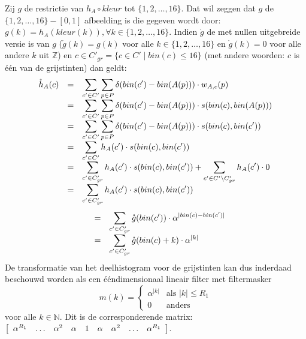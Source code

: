 Zij $g$ de restrictie van $h_A \circ kleur$ tot
$\{1,2,\ldots,16\}$. Dat wil zeggen dat $g$ de $\{1,2,\ldots,16\} - [0,1]$ afbeelding is die 
gegeven wordt door:
$g(k)=h_A(kleur(k)), \forall k \in \{1,2,\ldots,16\}$.
Indien $\mathring{g}$ de met nullen uitgebreide versie is van $g$ ($\mathring{g}(k)=g(k)$ voor
alle $k \in \{1,2,\ldots,16\}$ en $\mathring{g}(k)=0$ voor alle andere $k$ uit $\mathbb{Z}$)
en $c \in C'_{gr}=\{c \in C' \mid bin(c) \le 16\}$ (met
andere woorden: $c$ is \'e\'en van de grijstinten) dan geldt:
$$
\begin{array}{r@{\quad=\quad}l}
\mathring{h}_A(c)
 & \displaystyle \sum_{c' \in C'} \sum_{p \in P} \delta (bin(c')-bin(A(p))) \cdot w_{A,c}(p) \\[2pt]
 & \displaystyle \sum_{c' \in C'} \sum_{p \in P} \delta (bin(c')-bin(A(p))) \cdot s(bin(c),bin(A(p))) \\[2pt]
 & \displaystyle \sum_{c' \in C'} \sum_{p \in P} \delta (bin(c')-bin(A(p))) \cdot s(bin(c),bin(c')) \\[2pt]
 & \displaystyle\sum_{c' \in C'} h_A(c') \cdot s(bin(c),bin(c')) \\[2pt]
 & \displaystyle\sum_{c' \in C'_{gr}} h_A(c') \cdot s(bin(c),bin(c')) + \sum_{c' \in C' \setminus C'_{gr}} h_A(c') \cdot 0 \\[2pt]
 & \displaystyle\sum_{c' \in C'_{gr}} h_A(c') \cdot s(bin(c),bin(c')) %
\end{array}
$$
$$
\begin{array}{r@{\quad=\quad}l}
 & \displaystyle\sum_{c' \in C'_{gr}} \mathring{g}(bin(c')) \cdot \alpha^{|bin(c)-bin(c')|} \\[2pt]
 & \displaystyle\sum_{c' \in C'_{gr}} \mathring{g}(bin(c)+k) \cdot \alpha^{|k|}
\end{array}
$$
De transformatie van het deelhistogram voor de grijstinten kan dus inderdaad beschouwd worden
als een \'e\'endimensionaal lineair filter met filtermasker 
$$
m(k)= \left\{ 
\begin{array}{ll} 
\alpha^{|k|} & \textrm{als } |k| \le R_1 \\ 
0 & \textrm{anders} 
\end{array} \right.
$$
voor alle $k \in \mathbb{N}$. Dit is de corresponderende matrix: 
$
\left[ \begin{array}{l@{\quad\ldots\quad}lllll@{\quad\ldots\quad}l} \alpha^{R_1} & \alpha^{2} & \alpha & 1 & \alpha & \alpha^{2} & \alpha^{R_1} \end{array} \right]
$.

